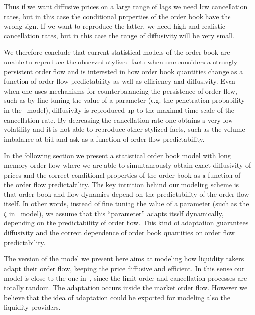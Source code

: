 \documentclass[12pt]{iopart}
\begin{document}
Thus if we want diffusive prices on a large range of lags we need low cancellation rates, but in this case the conditional properties of the order book have the wrong sign. If we want to reproduce the latter, we need high and realistic cancellation rates, but in this case the range of diffusivity will be very small. 

We therefore conclude that current statistical models of the order book are unable to reproduce the observed stylized facts when one considers a strongly persistent order flow and is interested in how order book quantities change as a function of order flow predictability as well as efficiency and diffusivity. Even when one uses mechanisms for counterbalancing the persistence of order flow, such as by fine tuning the value of a parameter (e.g. the penetration probability in the~\cite{toth2011anomalous} model), diffusivity is reproduced up to the maximal time scale of the cancellation rate. By decreasing the cancellation rate one obtains a very low volatility and it is not able to reproduce other stylized facts, such as the volume imbalance at bid and ask as a function of order flow predictability.

In the following section we present a statistical order book model with long memory order flow where we are able to simultaneously obtain exact diffusivity of prices and the correct conditional properties of the order book as a function of the order flow predictability. The key intuition behind our modeling scheme is that order book and flow dynamics depend on the predictability of the order flow itself. In other words, instead of fine tuning the value of a parameter (such as the $\zeta$ in~\cite{toth2011anomalous} model), we assume that this “parameter” adapts itself dynamically, depending on the predictability of order flow. This kind of adaptation guarantees diffusivity and the correct dependence of order book quantities on order flow predictability. 

The version of the model we present here aims at modeling how liquidity takers adapt their order flow, keeping the price diffusive and efficient. In this sense our model is close to the one in~\cite{toth2011anomalous}, since the limit order and cancellation processes are totally random. The adaptation occurs inside the market order flow. However we believe that the idea of adaptation could be exported for modeling also the liquidity providers.
\end{document}
